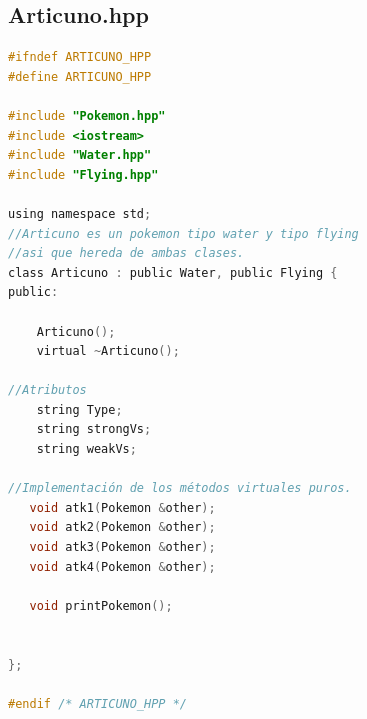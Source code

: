 \documentclass[11pt]{article}
\begin{document}
\subsection{Articuno.hpp}
\begin{lstlisting}[language=C]
#ifndef ARTICUNO_HPP
#define ARTICUNO_HPP

#include "Pokemon.hpp"
#include <iostream>
#include "Water.hpp"
#include "Flying.hpp"

using namespace std;
//Articuno es un pokemon tipo water y tipo flying
//asi que hereda de ambas clases. 
class Articuno : public Water, public Flying {
public:

    Articuno();
    virtual ~Articuno();

//Atributos
    string Type; 
    string strongVs;
    string weakVs;

//Implementación de los métodos virtuales puros. 
   void atk1(Pokemon &other);
   void atk2(Pokemon &other);
   void atk3(Pokemon &other);
   void atk4(Pokemon &other);

   void printPokemon();


};

#endif /* ARTICUNO_HPP */




\end{lstlisting}
\end{document}
